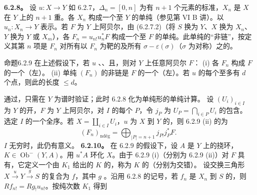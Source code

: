 \textbf{6.2.8。} 设 $u:X\to Y$ 如 6.2.7，$\Delta_n=[0,n]$ 为有 $n+1$ 个元素的标准，$X_n$ 是 $X$ 在 $Y$ 上的 $n+1$ 重。各 $X_n$ 构成一个至 $Y$ 的单纯（参见第 VI B 讲）。以 $u_n:X_n\to Y$ 表示。若 $F$ 为 $Y$ 上阿贝尔，由 (6.2.7.2)（将 $S$ 换为 $Y$、$X$ 换为 $X_n$、$Y$ 换为 $Y$ 或 $X_m$），各 $F_n=u_{n!}u_n^*F$ 构成一个至 $F$ 的单纯。此单纯的“非链”，按定义其第 $n$ 项是 $F_n$ 对所有以 $F_n$ 为靶的及所有 $\sigma-\varepsilon(\sigma)$（$\sigma$ 为对称）之的。
\begin{SGAresult}{命题}{6.2.9}
在上述假设下，若 $u$ 、、且，则对 $Y$ 上任意阿贝尔 $F$：
(i) 各 $F_n$ 构成 $F$ 的一个（左）。
(ii) 单纯 $(F_n)$ 的非链是 $F$ 的一个（左）。若 $u$ 的每个至多有 $d$ 个点，则此的长度 $\le d$。
\end{SGAresult}
通过，只需在 $Y$ 为谱时验证；此时 6.2.8 化为单纯形的单纯计算。
设 $(U_i)_{i\in I}$ 为 $Y$ 的开，$F$ 为 $Y$ 上阿贝尔，对 $I$ 的每个 $P$，令 $j_P$ 为 $U_P=\bigcap_{i\in P}U_i$ 的包含。选定 $I$ 的一个全序。若 $X=\coprod_{i\in I}U_i$，$u$ 为 $X$ 到 $Y$ 的，则 6.2.9 (ii) 的为
\[(F_n)_{\mathrm{nd\text{é}g}}=\bigoplus_{|P|=n+1}j_{P!}j_P^*F.\tag{6.2.9.1}\]
$I$ 无穷时，此仍有意义。
\textbf{6.2.10。} 在 6.2.9 的假设下，设 $A$ 是 $Y$ 上的挠环，$K\in\operatorname{Ob}^{-}(Y,A)$。用 $u^*A$ 环化 $X$。由于 6.2.9 (i)（分别为 6.2.9 (ii)）对 $F$ 具有，它定义一个由 $K_1$ 给出的 $K$ 的，称为 $K$ 的（分别为交错）。
设交换三角形 $X\xrightarrow{u}Y\xrightarrow{g}S$ 的复合为 $f$，其中 $g$ 。沿用 6.2.8 的记号，若 $f_n$ 是 $X_n$ 到 $S$ 的，则 $Rf_{n!}=Rg_!u_{n!}$。按纯次数 $K_1$ 得到
